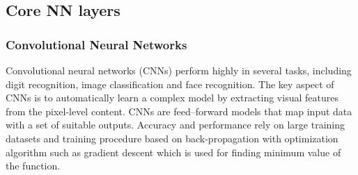 \subsection{Core NN layers}
\subsubsection{Convolutional Neural Networks}
Convolutional neural networks (CNNs) perform highly in several tasks, including digit recognition, image classification and face recognition. The key aspect of CNNs is to automatically learn a complex model by extracting visual features from the pixel-level content.
CNNs are feed–forward models that map input data with a set of suitable outputs. 
Accuracy and performance rely on large training datasets and training procedure based on back-propagation with optimization algorithm such as gradient descent which is used for finding minimum value of the function.\citep{Acquarelli2017}




